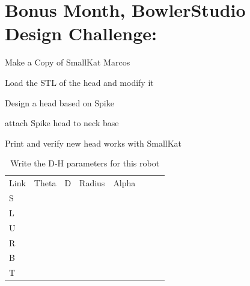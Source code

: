 \documentclass{article}
\begin{document}
\newpage
\section{Bonus Month, BowlerStudio Design Challenge:}
\begin{todolist}
	\item Make a Copy of SmallKat Marcos
	\item Load the STL of the head and modify it
	\item Design a head based on Spike
	\item attach Spike head to neck base
	\item Print and verify new head works with SmallKat
\end{todolist}

\newpage


\begin{table}
	\caption{Write the D-H parameters for this robot}
	\begin{tabular}[t]{lccccccc}
		Link & Theta & D 	  & Radius & Alpha \\ 
		S 	 & 	     &        &        &       \\	
		L 	 & 	     &        &        &       \\	
		U 	 & 	     &        &        &       \\	
		R 	 & 	     &        &        &       \\	
		B 	 & 	     &        &        &       \\	
		T 	 & 	     &        &        &       \\	
	\end{tabular}
\end{table}
\newpage
\end{document}

